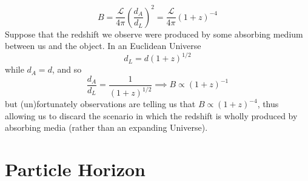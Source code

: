 \begin{equation}
    B = \frac{\mathcal{L}}{4\pi}\left(\frac{d_{A}}{d_{L}}\right)^{2} = \frac{\mathcal{L}}{4\pi}(1+z)^{-4}
\end{equation}
Suppose that the redshift we observe were produced by some absorbing medium between us and the object. In an Euclidean Universe
\begin{equation}
    d_{L} = d(1+z)^{1/2}
\end{equation}
while $d_{A} = d$, and so 
\begin{equation}
    \frac{d_{A}}{d_{L}} = \frac{1}{(1+z)^{1/2}} \implies B \propto (1+z)^{-1}
\end{equation}
but (un)fortunately observations are telling us that $B \propto (1+z)^{-4}$, thus allowing us to discard the scenario in which the redshift is wholly produced by absorbing media (rather than an expanding Universe).

\section{Particle Horizon}

